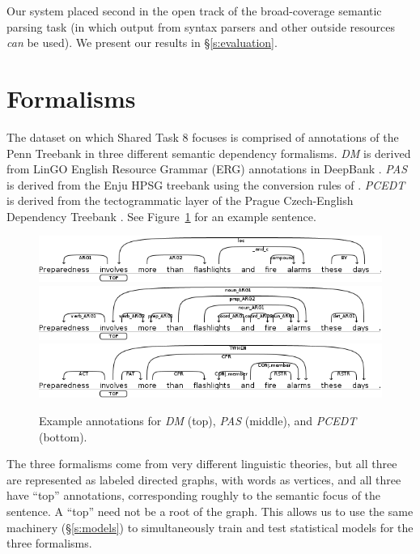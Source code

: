 \documentclass[11pt]{article}
\newcommand{\sam}[1]{\textcolor{blue}{[#1 -SMT]}}
\renewcommand{\sam}[1]{}
\begin{document}
Our system placed second in the open track of the broad-coverage semantic
parsing task (in which output from syntax parsers and other outside resources \emph{can} be used).
We present our results in \S\ref{s:evaluation}.



\section{Formalisms} \label{s:formalisms}
The dataset on which Shared Task 8 focuses is comprised of annotations of the Penn Treebank in three different semantic dependency formalisms.
\emph{DM} is derived from LinGO English Resource Grammar (ERG)
annotations in DeepBank \cite{flickinger_deepbank_2012}.
\emph{PAS} is derived from the Enju HPSG treebank using the
conversion rules of .
\emph{PCEDT} is derived from the tectogrammatic layer of the
Prague Czech-English Dependency Treebank \cite{hajic_building_1998}.
See Figure~\ref{fig:formalisms} for an example sentence.
\begin{figure}
	\centering
		\includegraphics[width=.5\textwidth]{fig/example_dm} \\
		\includegraphics[width=.5\textwidth]{fig/example_pas} \\
		\includegraphics[width=.5\textwidth]{fig/example_pcedt}
	\caption{Example annotations for \emph{DM} (top), \emph{PAS}
          (middle), and \emph{PCEDT} (bottom).}
	\label{fig:formalisms}
\end{figure}

The three formalisms come from very different linguistic theories, but all
three are represented as labeled directed graphs, with words as vertices, and
all three have ``top'' annotations, corresponding roughly to the
semantic focus of the sentence.  A ``top'' need not be a root of the
graph.
This allows us to use the same machinery (\S\ref{s:models}) to simultaneously
train and test statistical models for the three formalisms.
\sam{Stats about \% multiple roots, \% multiple tops, \% tree, \% acyclic}
\end{document}
